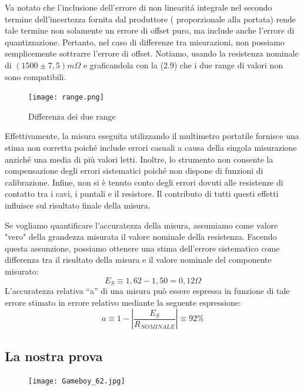 Va notato che l'inclusione dell'errore di non linearit\'a integrale nel secondo termine dell'incertezza fornita dal produttore ( proporzionale alla portata) rende tale termine non solamente un errore di offset puro, ma include anche l'errore di quantizzazione. Pertanto, nel caso di differenze tra misurazioni, non possiamo semplicemente sottrarre l'errore di offset.
Notiamo, usando la resistenza nominale di $(1500 \pm 7,5) m\Omega$ e graficandola con la (2.9) che i due range di valori non sono compatibili.

\begin{figure}[h]
    \centering
    \texttt{[image: range.png]}
    \caption{Differenza dei due range}
    \label{fig:range}
\end{figure}
\FloatBarrier

Effettivamente, la misura eseguita utilizzando il multimetro portatile fornisce una stima non corretta poiché include errori casuali a causa della singola misurazione anziché una media di più valori letti. Inoltre, lo strumento non consente la compensazione degli errori sistematici poiché non dispone di funzioni di calibrazione. Infine, non si è tenuto conto degli errori dovuti alle resistenze di contatto tra i cavi, i puntali e il resistore. Il contributo di tutti questi effetti influisce sul risultato finale della misura.

Se vogliamo quantificare l'accuratezza della misura, assumiamo come valore "vero" della grandezza misurata il valore nominale della resistenza. Facendo questa assunzione, possiamo ottenere una stima dell'errore sistematico come differenza tra il risultato della misura e il valore nominale del componente misurato:
\begin{equation}
    E_S \equiv 1,62 - 1,50 = 0,12\Omega
\end{equation}
L’accuratezza relativa “a” di una misura può essere espressa in funzione di tale errore 
stimato in errore relativo mediante la seguente espressione: 
\begin{equation}
     a \equiv 1 - \left| \frac{E_S}{R_{NOMINALE}}\right| \equiv 92\%
\end{equation}


\subsection*{La nostra prova}
\label{sub:nosta_prova_first}


\vspace{0.5cm}
\FloatBarrier
\begin{figure}[h]
    \centering
    \texttt{[image: Gameboy\_62.jpg]}
    \label{fig:mult_port_nostro}
\end{figure}
\FloatBarrier
    

